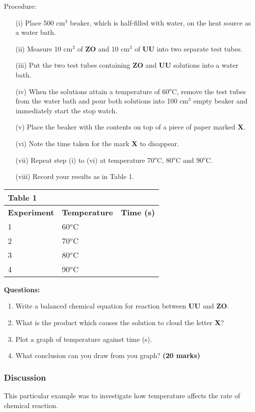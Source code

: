 Procedure:\\
\begin{enumerate}
\item[(i)] Place 500 cm$^3$ beaker, which is half-filled with water, on the heat source as a water bath.
\item[(ii)] Measure 10 cm$^3$ of \textbf{ZO} and 10 cm$^3$ of \textbf{UU} into two separate test tubes.
\item[(iii)] Put the two test tubes containing \textbf{ZO} and \textbf{UU} solutions into a water bath.
\item[(iv)] When the solutions attain a temperature of 60$^o$C, remove the test tubes from the water bath and pour both solutions into 100 cm$^3$ empty beaker and immediately start the stop watch.
\item[(v)] Place the beaker with the contents on top of a piece of paper marked \textbf{X}.
\item[(vi)] Note the time taken for the mark \textbf{X} to disappear.
\item[(vii)] Repeat step (i) to (vi) at temperature 70$^o$C, 80$^o$C and 90$^o$C.
\item[(viii)] Record your results as in Table 1.
\end{enumerate}

\begin{center}
\begin{tabular}{|p{5cm}|p{5cm}|p{3cm}|}
\multicolumn{1}{l}{Table 1}&\multicolumn{1}{l}{ }&\multicolumn{1}{l}{ }\\ \hline
\textbf{Experiment}&\textbf{Temperature}&\textbf{Time (s)}\\ \hline
1&60$^o$C&\\ \hline
2&70$^o$C&\\ \hline
3&80$^o$C&\\ \hline
4&90$^o$C&\\ \hline
\end{tabular}
\end{center}

\textbf{Questions:}\\
\begin{enumerate}
\item Write a balanced chemical equation for reaction between \textbf{UU} and \textbf{ZO}.
\item What is the product which causes the solution to cloud the letter \textbf{X}?
\item Plot a graph of temperature against time (s).
\item What conclusion can you draw from you graph? \hfill \textbf{(20 marks)} \\
\end{enumerate}


\subsubsection{Discussion}
This particular example was to investigate how temperature affects the rate of chemical reaction. %